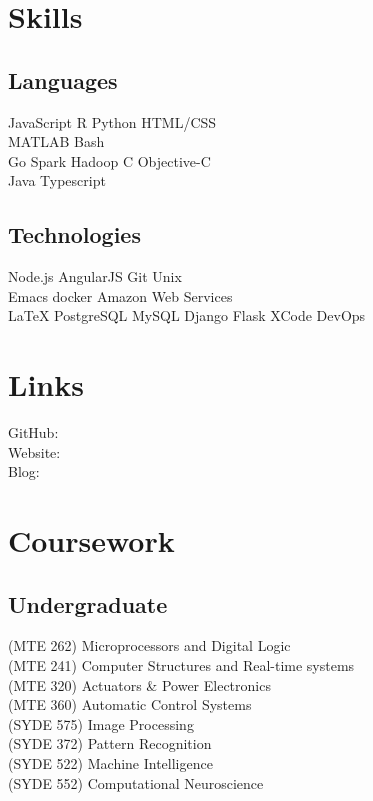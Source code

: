 \documentclass[]{deedy-resume-openfont}
\begin{document}
\begin{minipage}[t]{0.33\textwidth}
\section{Skills}
\subsection{Languages}
JavaScript \textbullet{} R \textbullet{} Python \textbullet{} HTML/CSS \\
MATLAB \textbullet{} Bash\\
Go \textbullet{} Spark \textbullet{} Hadoop \textbullet{} C \textbullet{} Objective-C \\
Java \textbullet{} Typescript\\
\sectionsep

\subsection{Technologies}
Node.js \textbullet{} AngularJS \textbullet{} Git \textbullet{} Unix \\
Emacs \textbullet{} docker \textbullet{} Amazon Web Services\\
LaTeX \textbullet{} PostgreSQL \textbullet{} MySQL
Django \textbullet{} Flask \textbullet{} XCode \textbullet{} DevOps
\sectionsep


\section{Links}
GitHub: \href{https://github.com/prajnak}{} \\
Website:  \href{https://prajis.me}{} \\
Blog:  \href{https://prajis.me/blog}{} \\
\sectionsep


\section{Coursework}
\subsection{Undergraduate}
(MTE 262) Microprocessors and Digital Logic\\
(MTE 241) Computer Structures and Real-time systems \\
(MTE 320) Actuators \& Power Electronics\\
(MTE 360) Automatic Control Systems\\
(SYDE 575) Image Processing\\
(SYDE 372) Pattern Recognition\\
(SYDE 522) Machine Intelligence\\
(SYDE 552) Computational Neuroscience\\
\sectionsep



\end{minipage}
\end{document}
